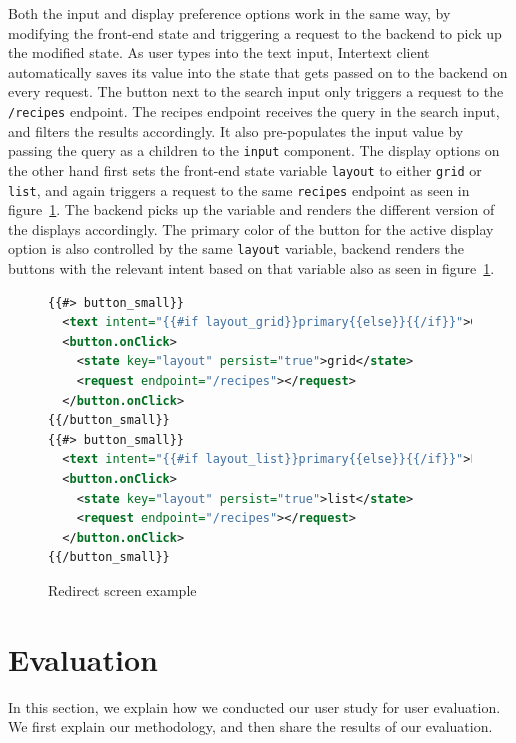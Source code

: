 Both the input and display preference options work in the same way, by modifying the front-end state and triggering a request to the backend to pick up the modified state. As user types into the text input, Intertext client automatically saves its value into the state that gets passed on to the backend on every request. The  button next to the search input only triggers a request to the \texttt{/recipes} endpoint. The recipes endpoint receives the query in the search input, and filters the results accordingly. It also pre-populates the input value by passing the query as a children to the \texttt{input} component. The display options on the other hand first sets the front-end state variable \texttt{layout} to either \texttt{grid} or \texttt{list}, and again triggers a request to the same \texttt{recipes} endpoint as seen in figure~\ref{fig:rec_display_options}. The backend picks up the variable and renders the different version of the displays accordingly. The primary color of the button for the active display option is also controlled by the same \texttt{layout} variable, backend renders the buttons with the relevant intent based on that variable also as seen in figure~\ref{fig:rec_display_options}.

\begin{figure}[htb]
\begin{minipage}{\linewidth}
\begin{lstlisting}[language=xml]
{{#> button_small}}
  <text intent="{{#if layout_grid}}primary{{else}}{{/if}}">Grid</text>
  <button.onClick>
    <state key="layout" persist="true">grid</state>
    <request endpoint="/recipes"></request>
  </button.onClick>
{{/button_small}}
{{#> button_small}}
  <text intent="{{#if layout_list}}primary{{else}}{{/if}}">List</text>
  <button.onClick>
    <state key="layout" persist="true">list</state>
    <request endpoint="/recipes"></request>
  </button.onClick>
{{/button_small}}
\end{lstlisting}
\end{minipage}
\caption{Redirect screen example}%
\label{fig:rec_display_options}%
\end{figure}


\section{Evaluation}

In this section, we explain how we conducted our user study for user evaluation. We first explain our methodology, and then share the results of our evaluation.

